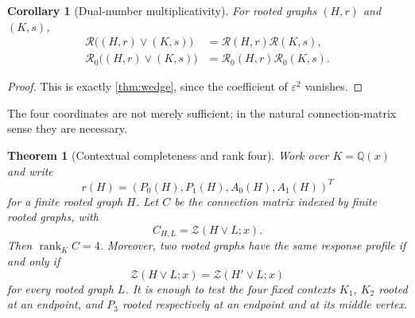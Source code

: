 \documentclass[11pt,reqno]{amsart}
\newtheorem{theorem}{Theorem}[section]
\newtheorem{corollary}[corollary]{Corollary}
\theoremstyle{definition}
\newcommand{\Zpoly}{\mathcal Z}
\newcommand{\eps}{\varepsilon}
\begin{document}
\begin{corollary}[Dual-number multiplicativity]\label{cor:dual}
For rooted graphs $(H,r)$ and $(K,s)$,
\begin{align*}
  \mathscr R\bigl((H,r)\vee(K,s)\bigr)
  &=\mathscr R(H,r)\mathscr R(K,s),\\
  \mathscr R_0\bigl((H,r)\vee(K,s)\bigr)
  &=\mathscr R_0(H,r)\mathscr R_0(K,s).
\end{align*}
\end{corollary}

\begin{proof}
This is exactly \cref{thm:wedge}, since the coefficient of $\eps^2$ vanishes.
\end{proof}

The four coordinates are not merely sufficient; in the natural connection-matrix
sense they are necessary.

\begin{theorem}[Contextual completeness and rank four]\label{thm:connection-rank}
Work over $K=\mathbb Q(x)$ and write
\[
  r(H)=(P_0(H),P_1(H),A_0(H),A_1(H))^T
\]
for a finite rooted graph $H$.  Let $C$ be the connection matrix indexed by
finite rooted graphs, with
\[
  C_{H,L}=\Zpoly(H\vee L;x).
\]
Then $\operatorname{rank}_K C=4$.  Moreover, two rooted graphs have the same
response profile if and only if
\[
  \Zpoly(H\vee L;x)=\Zpoly(H'\vee L;x)
\]
for every rooted graph $L$.  It is enough to test the four fixed contexts
$K_1$, $K_2$ rooted at an endpoint, and $P_3$ rooted respectively at an
endpoint and at its middle vertex.
\end{theorem}
\end{document}
